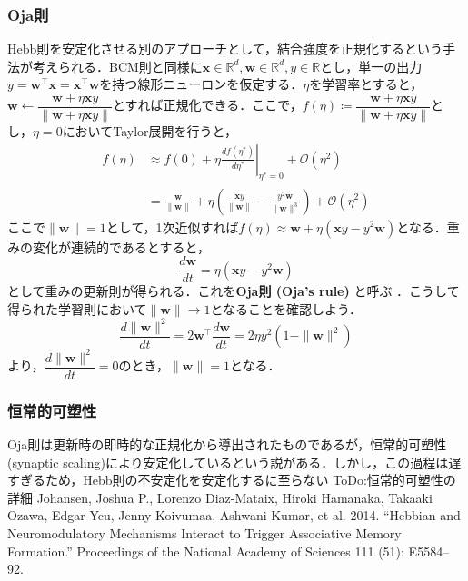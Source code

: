 \subsubsection{Oja則}
Hebb則を安定化させる別のアプローチとして，結合強度を正規化するという手法が考えられる．BCM則と同様に$\mathbf{x}\in \mathbb{R}^d, \mathbf{w}\in \mathbb{R}^d, y\in \mathbb{R}$とし，単一の出力$y = \mathbf{w}^\top \mathbf{x}=\mathbf{x}^\top \mathbf{w}$を持つ線形ニューロンを仮定する．$\eta$を学習率とすると，$\mathbf{w}\leftarrow\dfrac{\mathbf{w}+\eta \mathbf{x}y}{\|\mathbf{w}+\eta \mathbf{x}y\|}$とすれば正規化できる．ここで，$f(\eta)\coloneqq\dfrac{\mathbf{w}+\eta \mathbf{x}y}{\|\mathbf{w}+\eta \mathbf{x}y\|}$とし，$\eta=0$においてTaylor展開を行うと，
\begin{align}
f(\eta)&\approx f(0) + \eta \left.\frac{df(\eta^*)}{d\eta^*}\right|_{\eta^*=0} + \mathcal{O}(\eta^2)\\
&=\frac{\mathbf{w}}{\|\mathbf{w}\|} + \eta \left(\frac{\mathbf{x}y}{\|\mathbf{w}\|}-\frac{y^2\mathbf{w}}{\|\mathbf{w}\|^3}\right)+ \mathcal{O}(\eta^2)
\end{align}
ここで$\|\mathbf{w}\|=1$として，1次近似すれば$f(\eta)\approx \mathbf{w} + \eta \left(\mathbf{x}y-y^2 \mathbf{w}\right)$となる．重みの変化が連続的であるとすると，
\begin{equation}
\frac{d\mathbf{w}}{dt} = \eta \left(\mathbf{x}y-y^2 \mathbf{w}\right)
\end{equation}
として重みの更新則が得られる．これを\textbf{Oja則 (Oja's rule)} と呼ぶ \citep{Oja1982-yd}．こうして得られた学習則において$\|\mathbf{w}\|\to 1$となることを確認しよう．
\begin{equation}
\frac{d\|\mathbf{w}\|^2}{dt}=2\mathbf{w}^\top\frac{d\mathbf{w}}{dt}= 2\eta y^2\left(1-\|\mathbf{w}\|^2\right)
\end{equation}
より，$\dfrac{d\|\mathbf{w}\|^2}{dt}=0$のとき，$\|\mathbf{w}\|= 1$となる．
\subsubsection{恒常的可塑性}
Oja則は更新時の即時的な正規化から導出されたものであるが，恒常的可塑性 (synaptic scaling)により安定化しているという説がある\citep{Turrigiano2008-lm}\citep{Yee2017-fb}．しかし，この過程は遅すぎるため，Hebb則の不安定化を安定化するに至らない\citep{Zenke2017-el}
ToDo:恒常的可塑性の詳細
Johansen, Joshua P., Lorenzo Diaz-Mataix, Hiroki Hamanaka, Takaaki Ozawa, Edgar Ycu, Jenny Koivumaa, Ashwani Kumar, et al. 2014. “Hebbian and Neuromodulatory Mechanisms Interact to Trigger Associative Memory Formation.” Proceedings of the National Academy of Sciences 111 (51): E5584–92.
